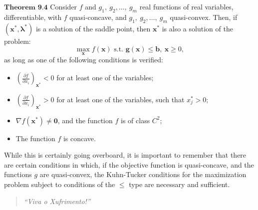 \documentclass[0pt, a4paper]{article}
\begin{document}
$\textbf{Theorem 9.4}$ Consider $f$ and $g_1,\ g_2,\dots,\ g_m$ real functions of real variables, differentiable, with $f$ quasi-concave, and $g_1,\ g_2,\dots,\ g_m$ quasi-convex. Then, if $(\textbf{x}^*,\boldsymbol{\lambda}^*)$ is a solution of the saddle point, then $\textbf{x}^*$ is also a solution of the problem:
$$\max_\textbf{x}f(\textbf{x})\text{ s.t. }\textbf{g}(\textbf{x})\leq\textbf{b},\ \textbf{x}\geq0,$$
as long as one of the following conditions is verified:
\begin{itemize}
	\item $\left(\frac{\partial f}{\partial x_i}\right)_{\textbf{x}^*}<0$ for at least one of the variables;
	\item $\left(\frac{\partial f}{\partial x_i}\right)_{\textbf{x}^*}>0$ for at least one of the variables, such that $x^*_j>0$;
	\item $\nabla f(\textbf{x}^*)\neq\textbf{0}$, and the function $f$ is of class $C^2$;
	\item The function $f$ is concave.
\end{itemize}

While this is certainly going overboard, it is important to remember that there are certain conditions in which, if the objective function is quasi-concave, and the functions $g$ are quasi-convex, the Kuhn-Tucker conditions for the maximization problem subject to conditions of the $\leq$ type are necessary and sufficient.

\vspace*{\fill} 
\begin{quote} 
	\centering 
	\textit{``Viva o Xufrimento!''} 
\end{quote}
\vspace*{\fill}
\end{document}
